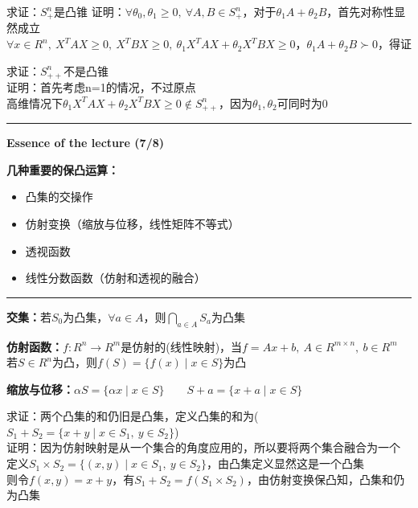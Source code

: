 \documentclass[11pt]{ctexart}         %
\begin{document}
求证：$S_+^n$是凸锥
证明：$\forall \theta_0,\theta_1\geq 0,\ \forall A,B\in S_+^n$，对于$\theta_1A+\theta_2B$，首先对称性显然成立\\
\phantom{证明：}$\forall x\in R^n,\ X^TAX\geq 0,\ X^TBX\geq 0,\ \theta_1X^TAX+\theta_2X^TBX\geq 0$，$\theta_1A+\theta_2B\succ 0$，得证

求证：$S_{++}^n$不是凸锥\\
证明：首先考虑n=1的情况，不过原点\\
\phantom{证明：}高维情况下$\theta_1X^TAX+\theta_2X^TBX\geq 0\notin S^n_{++}$，因为$\theta_1,\theta_2$可同时为0

\newpage
\hrule height 4pt
\begin{Large}
	\textbf{Essence of the lecture (7/8)}\\
\end{Large}
\begin{large}
	\textbf{几种重要的保凸运算：} 
\end{large}
\vspace{-16pt}
\begin{itemize} \setlength{\itemsep}{0pt}
	\item 凸集的交操作
	\item 仿射变换（缩放与位移，线性矩阵不等式）
	\item 透视函数
	\item 线性分数函数（仿射和透视的融合）
\end{itemize}
\hrule height 4pt

\textbf{交集：}若$S_0$为凸集，$\forall a\in A$，则$\displaystyle\bigcap_{a\in A}S_a$为凸集

\textbf{仿射函数：}$f:R^n\to R^m$是仿射的({\color{red}线性映射})，当{\color{red}$f=Ax+b$}$,\ A\in R^{m\times n},\ b\in R^m$\\
\phantom{仿射函数：}若$S\in R^n$为凸，则$f(S)=\{f(x)\mid x\in S\}$为凸

\textbf{缩放与位移：}$\alpha S=\{\alpha x\mid x\in S\}\qquad S+a=\{x+a\mid x\in S\}$

求证：两个凸集的和仍旧是凸集，定义凸集的和为($S_1+S_2=\{x+y\mid x\in S_1,\ y\in S_2\}$)\\
证明：因为仿射映射是从一个集合的角度应用的，所以要将两个集合融合为一个\\
\phantom{证明：}定义$S_1\times S_2=\{(x,y)\mid x\in S_1,\ y\in S_2\}$，由凸集定义显然这是一个凸集\\
\phantom{证明：}则令$f(x,y)=x+y$，有$S_1+S_2=f(S_1\times S_2)$，由仿射变换保凸知，凸集和仍为凸集
\end{document}
